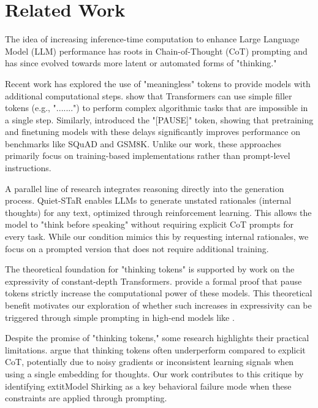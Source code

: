 \section{Related Work}
\label{sec:related_work}

The idea of increasing inference-time computation to enhance Large Language Model (LLM) performance has roots in Chain-of-Thought (CoT) prompting \cite{wei2022chain} and has since evolved towards more latent or automated forms of "thinking."

Recent work has explored the use of "meaningless" tokens to provide models with additional computational steps. \citet{pfau2024think} show that Transformers can use simple filler tokens (e.g., ".......") to perform complex algorithmic tasks that are impossible in a single step. Similarly, \citet{goyal2023pause} introduced the "[PAUSE]" token, showing that pretraining and finetuning models with these delays significantly improves performance on benchmarks like SQuAD and GSM8K. Unlike our work, these approaches primarily focus on training-based implementations rather than prompt-level instructions.

A parallel line of research integrates reasoning directly into the generation process. Quiet-STaR \cite{zelikman2024quiet} enables LLMs to generate unstated rationales (internal thoughts) for any text, optimized through reinforcement learning. This allows the model to "think before speaking" without requiring explicit CoT prompts for every task. While our \bstrationale condition mimics this by requesting internal rationales, we focus on a prompted version that does not require additional training.

The theoretical foundation for "thinking tokens" is supported by work on the expressivity of constant-depth Transformers. \citet{london2025pause} provide a formal proof that pause tokens strictly increase the computational power of these models. This theoretical benefit motivates our exploration of whether such increases in expressivity can be triggered through simple prompting in high-end models like \gpt.

Despite the promise of "thinking tokens," some research highlights their practical limitations. \citet{vennam2024rethinking} argue that thinking tokens often underperform compared to explicit CoT, potentially due to noisy gradients or inconsistent learning signals when using a single embedding for thoughts. Our work contributes to this critique by identifying 	extit{Model Shirking} as a key behavioral failure mode when these constraints are applied through prompting.
